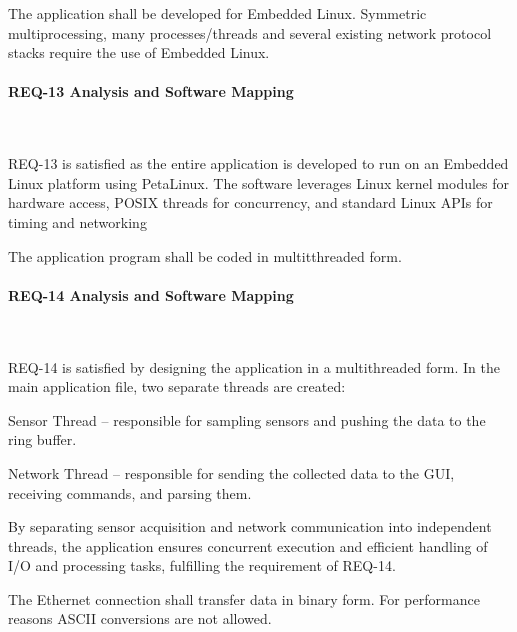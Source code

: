 \documentclass{article}
\begin{document}
\begin{tcolorbox}[
    title=REQ-13,
    colback=gray!5,
    colframe=black,
    fonttitle=\bfseries
]
The application shall be developed for Embedded Linux. Symmetric multiprocessing, 
many processes/threads and several existing network protocol stacks require the use 
of Embedded Linux.
\end{tcolorbox}

\paragraph{REQ-13 Analysis and Software Mapping}\

REQ-13 is satisfied as the entire application is developed to run on an Embedded 
Linux platform using PetaLinux. The software leverages Linux kernel modules for 
hardware access, POSIX threads for concurrency, and standard Linux APIs for timing 
and networking


\begin{tcolorbox}[
    title=REQ-14,
    colback=gray!5,
    colframe=black,
    fonttitle=\bfseries
]
The application program shall be coded in multitthreaded form.
\end{tcolorbox}

\paragraph{REQ-14 Analysis and Software Mapping}\

REQ-14 is satisfied by designing the application in a multithreaded form. In the 
main application file, two separate threads are created:

Sensor Thread – responsible for sampling sensors and pushing the data to the ring buffer.

Network Thread – responsible for sending the collected data to the GUI, receiving commands, and parsing them.

By separating sensor acquisition and network communication into independent threads, the application ensures concurrent execution and efficient handling of I/O and processing tasks, fulfilling the requirement of REQ-14.

\begin{tcolorbox}[
    title=REQ-16,
    colback=gray!5,
    colframe=black,
    fonttitle=\bfseries
]
The Ethernet connection shall transfer data in binary form.
For performance reasons ASCII conversions are not allowed.
\end{tcolorbox}
\end{document}
